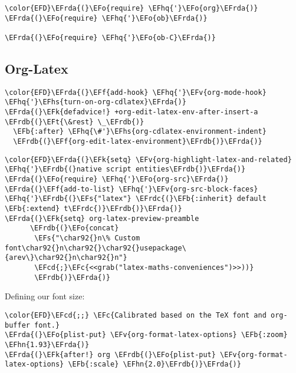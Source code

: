 \documentclass{article}
\newcommand{\EFc}[1]{\textcolor{EFc}{#1}} %
\newcommand{\EFcd}[1]{\textcolor{EFcd}{#1}} %
\newcommand{\EFs}[1]{\textcolor{EFs}{#1}} %
\newcommand{\EFk}[1]{\textcolor{EFk}{#1}} %
\newcommand{\EFb}[1]{\textcolor{EFb}{#1}} %
\newcommand{\EFf}[1]{\textcolor{EFf}{#1}} %
\newcommand{\EFv}[1]{\textcolor{EFv}{#1}} %
\newcommand{\EFt}[1]{\textcolor{EFt}{#1}} %
\newcommand{\EFo}[1]{\textcolor{EFo}{#1}} %
\newcommand{\EFhn}[1]{\textcolor{EFhn}{\textbf{#1}}} %
\newcommand{\EFhq}[1]{#1} %
\newcommand{\EFhs}[1]{\textcolor{EFhs}{#1}} %
\newcommand{\EFrda}[1]{\textcolor{EFrda}{#1}} %
\newcommand{\EFrdb}[1]{\textcolor{EFrdb}{#1}} %
\newcommand{\EFrdc}[1]{\textcolor{EFrdc}{#1}} %
\begin{document}
\begin{Code}
\begin{Verbatim}
\color{EFD}\EFrda{(}\EFo{require} \EFhq{'}\EFo{org}\EFrda{)}
\EFrda{(}\EFo{require} \EFhq{'}\EFo{ob}\EFrda{)}

\EFrda{(}\EFo{require} \EFhq{'}\EFo{ob-C}\EFrda{)}
\end{Verbatim}
\end{Code}

\subsection{Org-Latex}
\label{sec:orgc6d6ebb}
\begin{Code}
\begin{Verbatim}
\color{EFD}\EFrda{(}\EFf{add-hook} \EFhq{'}\EFv{org-mode-hook} \EFhq{'}\EFhs{turn-on-org-cdlatex}\EFrda{)}
\EFrda{(}\EFk{defadvice!} +org-edit-latex-env-after-insert-a \EFrdb{(}\EFt{\&rest} \_\EFrdb{)}
  \EFb{:after} \EFhq{\#'}\EFhs{org-cdlatex-environment-indent}
  \EFrdb{(}\EFf{org-edit-latex-environment}\EFrdb{)}\EFrda{)}
\end{Verbatim}
\end{Code}

\begin{Code}
\begin{Verbatim}
\color{EFD}\EFrda{(}\EFk{setq} \EFv{org-highlight-latex-and-related} \EFhq{'}\EFrdb{(}native script entities\EFrdb{)}\EFrda{)}
\EFrda{(}\EFo{require} \EFhq{'}\EFo{org-src}\EFrda{)}
\EFrda{(}\EFf{add-to-list} \EFhq{'}\EFv{org-src-block-faces} \EFhq{'}\EFrdb{(}\EFs{"latex"} \EFrdc{(}\EFb{:inherit} default \EFb{:extend} t\EFrdc{)}\EFrdb{)}\EFrda{)}
\EFrda{(}\EFk{setq} org-latex-preview-preamble
      \EFrdb{(}\EFo{concat}
       \EFs{"\char92{}n\% Custom font\char92{}n\char92{}\char92{}usepackage\{arev\}\char92{}n\char92{}n"}
       \EFcd{;}\EFc{<<grab("latex-maths-conveniences")>>))}
       \EFrdb{)}\EFrda{)}
\end{Verbatim}
\end{Code}

Defining our font size:
\begin{Code}
\begin{Verbatim}
\color{EFD}\EFcd{;;} \EFc{Calibrated based on the TeX font and org-buffer font.}
\EFrda{(}\EFo{plist-put} \EFv{org-format-latex-options} \EFb{:zoom} \EFhn{1.93}\EFrda{)}
\EFrda{(}\EFk{after!} org \EFrdb{(}\EFo{plist-put} \EFv{org-format-latex-options} \EFb{:scale} \EFhn{2.0}\EFrdb{)}\EFrda{)}
\end{Verbatim}
\end{Code}
\end{document}
